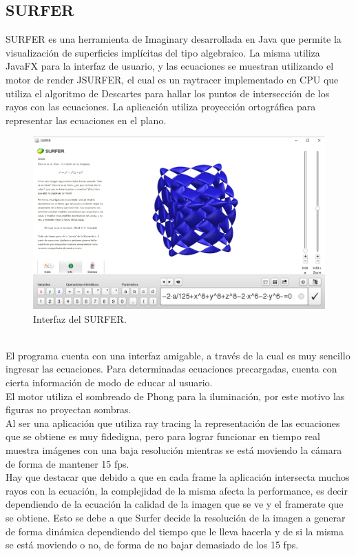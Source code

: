 \documentclass[12pt]{article}
\begin{document}
\subsection{SURFER}
SURFER es una herramienta de Imaginary desarrollada en Java que permite la visualización de superficies implícitas del tipo algebraico. La misma utiliza JavaFX para la interfaz de usuario, y las ecuaciones se muestran utilizando el motor de render JSURFER, el cual es un raytracer implementado en CPU que utiliza el algoritmo de Descartes para hallar los puntos de intersección de los rayos con las ecuaciones. La aplicación utiliza proyección ortográfica para representar las ecuaciones en el plano.
\begin{figure}[h]
\includegraphics[width=\textwidth]{surfer_interfaz.png}
\caption{Interfaz del SURFER.}
\end{figure}
\\El programa cuenta con una interfaz amigable, a través de la cual es muy sencillo ingresar las ecuaciones. Para determinadas ecuaciones precargadas, cuenta con cierta información de modo de educar al usuario.
\\El motor utiliza el sombreado de Phong\cite{Phong} para la iluminación, por este motivo las figuras no proyectan sombras.
\\Al ser una aplicación que utiliza ray tracing la representación de las ecuaciones que se obtiene es muy fidedigna, pero para lograr funcionar en tiempo real muestra imágenes con una baja resolución mientras se está moviendo la cámara de forma de mantener 15 fps.
\\Hay que destacar que debido a que en cada frame la aplicación intersecta muchos rayos con la ecuación, la complejidad de la misma afecta la performance, es decir dependiendo de la ecuación la calidad de la imagen que se ve y el framerate que se obtiene. Esto se debe a que Surfer decide la resolución de la imagen a generar de forma dinámica dependiendo del tiempo que le lleva hacerla y de si la misma se está moviendo o no, de forma de no bajar demasiado de los 15 fps.
\end{document}

